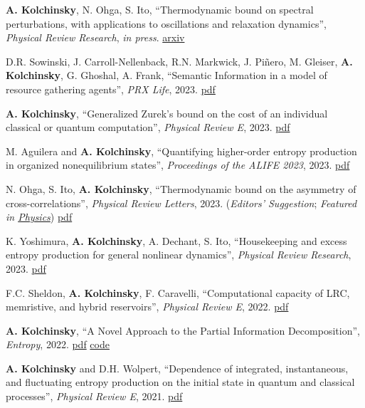 
\newcommand{\pdflink}[1]{\href{https://artemyk.github.io/assets/pdf/papers/#1.pdf}{pdf}}

\textbf{A. Kolchinsky}, N. Ohga, S. Ito, ``Thermodynamic bound on spectral perturbations, with applications to oscillations and relaxation dynamics'', \emph{Physical Review Research}, \emph{in press}. \href{http://arxiv.org/abs/2304.01714}{arxiv}

D.R. Sowinski, J. Carroll-Nellenback, R.N. Markwick, J. Piñero, M. Gleiser, \textbf{A. Kolchinsky}, G. Ghoshal, A. Frank, ``Semantic Information in a model of resource gathering agents'', \emph{PRX Life}, 2023. \pdflink{Sowinski-SemanticInformationInAModelOfResourceGatheringAgents}

\textbf{A. Kolchinsky}, ``Generalized Zurek's bound on the cost of an individual classical or quantum computation'', \emph{Physical Review E}, 2023. \pdflink{Kolchinsky_2023_GeneralizedZureksBound}

M. Aguilera and \textbf{A. Kolchinsky}, ``Quantifying higher-order entropy production in organized nonequilibrium states'', \emph{Proceedings of the ALIFE 2023}, 2023. \pdflink{Aguilera_2023_QuantifyingHigherOrderEP}

N. Ohga, S. Ito, \textbf{A. Kolchinsky}, ``Thermodynamic bound on the asymmetry of cross-correlations'', \emph{Physical Review Letters}, 2023. (\emph{Editors' Suggestion}; \emph{Featured in \href{https://physics.aps.org/articles/v16/142}{Physics}}) \pdflink{Ohga_Ito_Kolchinsky_2023_ThermodynamicBoundOnTheAsymmetryOfCrossCorrelations}

K. Yoshimura, \textbf{A. Kolchinsky}, A. Dechant, S. Ito, ``Housekeeping and excess entropy production for general nonlinear dynamics'', 
\emph{Physical Review Research}, 2023. \pdflink{Yoshimura_PRR_2023}

F.C. Sheldon, \textbf{A. Kolchinsky}, F. Caravelli, ``Computational capacity of LRC, memristive, and hybrid reservoirs'', \emph{Physical Review E}, 2022. \pdflink{Sheldon_LRC_PRE_2022}

\textbf{A. Kolchinsky}, ``A Novel Approach to the Partial Information Decomposition'', \emph{Entropy}, 2022.
\pdflink{Kolchinsky_2022_Novel_Approach_to_the_PID} \href{https://github.com/artemyk/redundancy}{code} 

\textbf{A. Kolchinsky} and D.H. Wolpert, ``Dependence of integrated, instantaneous, and fluctuating entropy production on the initial state in quantum and classical processes'', \emph{Physical Review E}, 2021. \pdflink{Kolchinsky_Wolpert_2021_Mismatch_cost}

